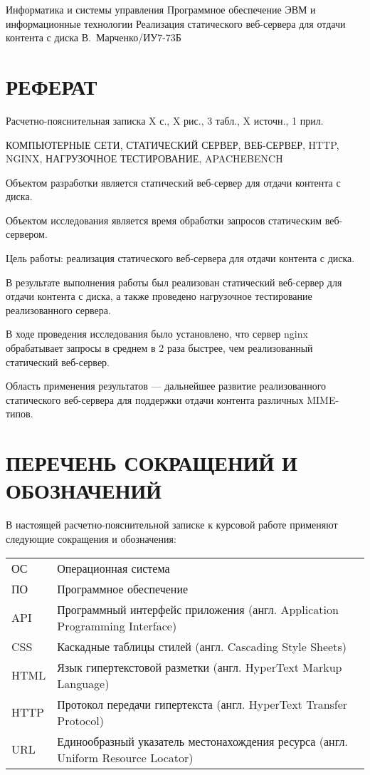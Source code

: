 \documentclass{bmstu}
\begin{document}
\makecourseworktitle
    {Информатика и системы управления}
    {Программное обеспечение ЭВМ и информационные технологии}
    {Реализация статического веб-сервера для отдачи контента с диска}
    {В.~Марченко/ИУ7-73Б}
    { }
    {}
    
\setcounter{page}{3}

{\centering \chapter*{РЕФЕРАТ}}

Расчетно-пояснительная записка X с., X рис., 3 табл., X источн., 1 прил.

\noindent КОМПЬЮТЕРНЫЕ СЕТИ, СТАТИЧЕСКИЙ СЕРВЕР, ВЕБ-СЕРВЕР, HTTP, NGINX, НАГРУЗОЧНОЕ ТЕСТИРОВАНИЕ, APACHEBENCH

Объектом разработки является статический веб-сервер для отдачи контента с диска.

Объектом исследования является время обработки запросов статическим веб-сервером.

Цель работы: реализация статического веб-сервера для отдачи контента с диска.

В результате выполнения работы был реализован статический веб-сервер для отдачи контента с диска, а также проведено нагрузочное тестирование реализованного сервера.

В ходе проведения исследования было установлено, что сервер nginx обрабатывает запросы в среднем в 2 раза быстрее, чем реализованный статический веб-сервер.

Область применения результатов --- дальнейшее развитие реализованного статического веб-сервера для поддержки отдачи контента различных MIME-типов.

{\centering \maketableofcontents}

{\centering \chapter*{ПЕРЕЧЕНЬ СОКРАЩЕНИЙ И ОБОЗНАЧЕНИЙ}}

В настоящей расчетно-пояснительной записке к курсовой работе применяют следующие сокращения и обозначения:

\begin{table}[H]
\begin{tabular}{p{5cm}p{10.5cm}}
ОС & Операционная система
\tabularnewline
ПО & Программное обеспечение
\tabularnewline
API & Программный интерфейс приложения (англ. Application Programming Interface)
\tabularnewline
CSS & Каскадные таблицы стилей (англ. Cascading Style Sheets)
\tabularnewline
HTML & Язык гипертекстовой разметки (англ. HyperText Markup Language)
\tabularnewline
HTTP & Протокол передачи гипертекста (англ. HyperText Transfer Protocol)
\tabularnewline
URL & Единообразный указатель местонахождения ресурса (англ. Uniform Resource Locator)
\tabularnewline
\end{tabular}
\end{table}
\end{document}
